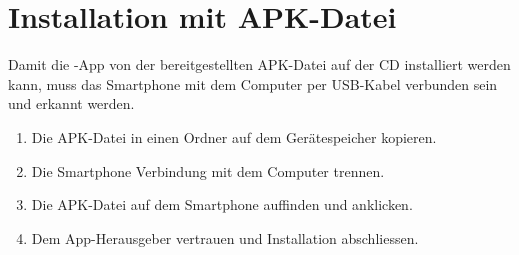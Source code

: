 \section{Installation mit APK-Datei}
Damit die -App von der bereitgestellten APK-Datei auf der CD installiert werden kann, muss das Smartphone mit dem Computer per USB-Kabel verbunden sein und erkannt werden. 

\begin{enumerate}
	\item Die APK-Datei in einen Ordner auf dem Gerätespeicher kopieren.
	\item Die Smartphone Verbindung mit dem Computer trennen.
	\item Die APK-Datei auf dem Smartphone auffinden und anklicken.
	\item Dem App-Herausgeber vertrauen und Installation abschliessen.
\end{enumerate}
